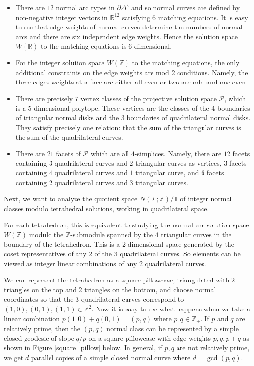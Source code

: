 \documentclass[12pt,reqno]{amsart}  %
\theoremstyle{definition}
\theoremstyle{remark}
\def\R{\mathbb{R}}
\newcommand{\TT}{\mathbb{T}}
\def\calP{\mathcal P}
\newcommand{\T}{\mathcal{T}}
\def\Z{\mathbb Z}
\def\TT{\mathbb T}   %
\begin{document}
\begin{itemize}
\item 
There are $12$ normal arc types in $\partial \Delta^3$ and so normal 
curves are defined by non-negative integer vectors in $\R^{12}$ satisfying 
$6$ matching equations. 
It is easy to see that edge weights of normal curves determine the numbers 
of normal arcs and there are six independent edge weights. 
Hence the solution space $W(\R)$ to the matching equations is $6$-dimensional. 
\item 
For the integer solution space $W(\Z)$ to the matching equations, 
the only additional constraints on the edge weights are mod 2 conditions. 
Namely, the three edges weights at a face are either all even or two are 
odd and one even. 
\item 
There are precisely $7$ vertex classes of the projective solution space 
$\calP$, which is a $5$-dimensional polytope. 
These vertices are the classes of the $4$ boundaries of triangular normal 
disks and the $3$ boundaries of quadrilateral normal disks. 
They satisfy precisely one relation: that the sum of the triangular curves 
is the sum of the quadrilateral curves. 
\item 
There are $21$ facets of $\calP$ which are all $4$-simplices. Namely, there 
are $12$ facets containing $3$ quadrilateral curves and $2$ triangular 
curves as vertices, $3$ facets containing $4$ quadrilateral curves and 
$1$ triangular curve, and $6$ facets containing $2$ quadrilateral curves 
and $3$ triangular curves. 
\end{itemize}

Next, we want to analyze the quotient space $N(\T;\Z)/\TT$ of integer 
normal classes modulo tetrahedral solutions, working in quadrilateral space. 

For each tetrahedron, this is equivalent to studying the normal arc 
solution space $W(\Z)$ modulo the $\Z$-submodule spanned by the $4$ 
triangular curves in the boundary of the tetrahedron. This is a 
2-dimensional space generated by the coset representatives of any 2 
of the 3 quadrilateral curves. So elements can be viewed as integer 
linear combinations of any 2 quadrilateral curves.

We can represent the tetrahedron as a square pillowcase, triangulated 
with 2 triangles on the top and 2 triangles on the bottom, and choose 
normal coordinates so that the 3 quadrilateral curves correspond to 
$(1,0), (0,1), (1,1) \in \Z^2$. Now it is easy to see what happens when 
we take a linear combination $p(1,0)+q(0,1)=(p,q)$ where $p,q \in \Z_+$. 
If $p$ and $q$ are relatively prime, then the $(p,q)$ normal class can 
be represented by a simple closed geodesic of slope $q/p$ 
on a square pillowcase with edge weights $p,q,p+q$ as shown in 
Figure \ref{square_pillow} below. In general, if $p,q$ are not relatively 
prime, we get $d$ parallel copies of a simple closed normal curve where 
$d = \gcd(p,q)$. 
 
\end{document}
